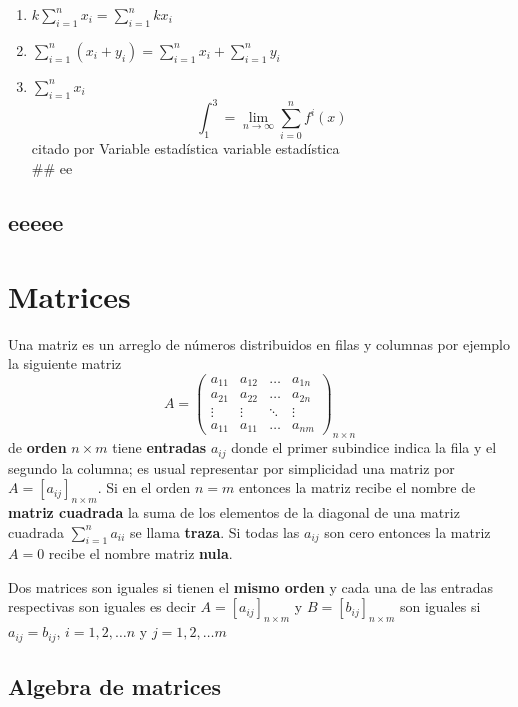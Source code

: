 \documentclass[10pt,]{krantz}
\providecommand{\tightlist}{%
  \setlength{\itemsep}{0pt}\setlength{\parskip}{0pt}}
\theoremstyle{definition}
\theoremstyle{definition}
\theoremstyle{definition}
\theoremstyle{definition}
\theoremstyle{remark}
\begin{document}
\begin{enumerate}
\def\labelenumi{\arabic{enumi}.}
\tightlist
\item
  \(k\sum_{i=1}^nx_i=\sum_{i=1}^nkx_i\)
\item
  \(\sum_{i=1}^n\left(x_i+y_i\right)=\sum_{i=1}^nx_i+\sum_{i=1}^ny_i\)
\item
  \(\sum_{i=1}^nx_i\)
  \[\int_1^3=\lim_{n\to \infty}\sum_{i=0}^{n}f^i(x)\]
  citado por \citep{xie2015}
  Variable estadística variable estadística\\
  \#\# ee
\end{enumerate}

\hypertarget{eeeee}{%
\section{eeeee}\label{eeeee}}

\hypertarget{matrices}{%
\chapter{Matrices}\label{matrices}}

Una matriz es un arreglo de números distribuidos en filas y columnas por ejemplo la siguiente matriz
\[A=\begin{pmatrix}
a_{11}&a_{12}&\ldots&a_{1n}\\
a_{21}&a_{22}&\ldots&a_{2n}\\
\vdots & \vdots & \ddots &\vdots \\
a_{11}&a_{11}&\ldots&a_{nm}
\end{pmatrix}_{n\times n}\]
de \textbf{orden} \(n\times m\) tiene \textbf{entradas} \(a_{ij}\) donde el primer subindice indica la fila y el segundo la columna; es usual representar por simplicidad una matriz por \(A=[a_{ij}]_{n\times m}\). Si en el orden \(n=m\) entonces la matriz recibe el nombre de \textbf{matriz cuadrada} la suma de los elementos de la diagonal de una matriz cuadrada \(\sum_{i=1}^na_{ii}\) se llama \textbf{traza}. Si todas las \(a_{ij}\) son cero entonces la matriz \(A=0\) recibe el nombre matriz \textbf{nula}.

Dos matrices son iguales si tienen el \textbf{mismo orden} y cada una de las entradas respectivas son iguales es decir \(A=[a_{ij}]_{n\times m}\) y \(B=[b_{ij}]_{n\times m}\) son iguales si \(a_{ij}=b_{ij}\), \(i=1,2,\ldots n\) y \(j=1,2,\ldots m\)

\hypertarget{algebra-de-matrices}{%
\section{Algebra de matrices}\label{algebra-de-matrices}}
\end{document}
